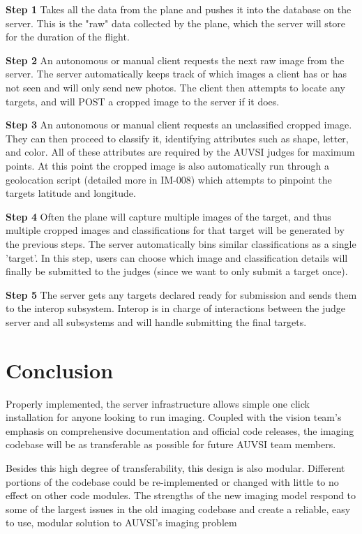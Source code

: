 \documentclass[]{auvsi_doc}
\begin{document}
\textbf{Step 1} Takes all the data from the plane and pushes it into the database 
on the server. This is the "raw" data collected by the plane, which the server 
will store for the duration of the flight.

\textbf{Step 2} An autonomous or manual client requests the next raw image from the 
server. The server automatically keeps track of which images a client has or has not seen
and will only send new photos. The client then attempts to locate any targets, and will 
POST a cropped image to the server if it does.

\textbf{Step 3} An autonomous or manual client requests an unclassified cropped 
image. They can then proceed to classify it, identifying attributes such as shape,
letter, and color. All of these attributes are required by the AUVSI judges for 
maximum points. At this point the cropped image is also automatically run through 
a geolocation script (detailed more in IM-008) which attempts to pinpoint the 
targets latitude and longitude.

\textbf{Step 4} Often the plane will capture multiple images of the target, and thus 
multiple cropped images and classifications for that target will be generated by the 
previous steps. The server automatically bins similar classifications as a single 'target'.
In this step, users can choose which image and classification details will finally be submitted
to the judges (since we want to only submit a target once).

\textbf{Step 5} The server gets any targets declared ready for submission and sends
them to the interop subsystem. Interop is in charge of interactions between the 
judge server and all subsystems and will handle submitting the final targets.

\section{Conclusion}

Properly implemented, the server infrastructure allows simple one click installation
for anyone looking to run imaging. Coupled with the vision team's emphasis on comprehensive
documentation and official code releases, the imaging codebase will be as transferable as 
possible for future AUVSI team members.

Besides this high degree of transferability, this design is also modular. Different 
portions of the codebase could be re-implemented or changed with little to no effect on 
other code modules. The strengths of the new imaging model respond to some of the largest
issues in the old imaging codebase and create a reliable, easy to use, modular solution
to AUVSI's imaging problem
\end{document}
